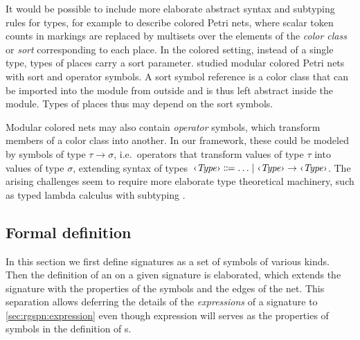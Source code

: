 \begin{remark}\label{rem:rgspn:colored}
  It would be possible to include more elaborate abstract syntax and subtyping rules for types, for example to describe colored Petri nets, where scalar token counts in markings are replaced by multisets over the elements of the \emph{color class} or \emph{sort} corresponding to each place. In the colored setting, instead of a single  type, types of places carry a sort parameter. \citet{Kindler07modular} studied modular colored Petri nets with sort and operator symbols. A sort symbol reference is a color class that can be imported into the module from outside and is thus left abstract inside the module. Types of places thus may depend on the sort symbols.

  Modular colored nets may also contain \emph{operator} symbols, which transform members of a color class into another. In our framework, these could be modeled by symbols of type \(\tau \to \sigma\), i.e.~operators that transform values of type \(\tau\) into values of type \(\sigma\), extending syntax of types~\(\ebnfVar{Type} \ebnfEq \ldots \mid \ebnfVar{Type} \to \ebnfVar{Type}\). The arising challenges seem to require more elaborate type theoretical machinery, such as typed lambda calculus with subtyping .
\end{remark}

\subsection{Formal definition}

In this section we first define  signatures as a set of symbols of various kinds. Then the definition of an  on a given signature is elaborated, which extends the signature with the properties of the symbols and the edges of the net. This separation allows deferring the details of the \emph{expressions} of a signature to \vref{sec:rgspn:expression} even though expression will serves as the properties of symbols in the definition of s.

